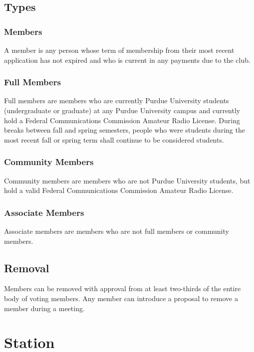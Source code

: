 \documentclass{article}
\begin{document}
\subsection{Types}

\subsubsection{Members}

A member is any person whose term of membership from their most recent
application has not expired and who is current in any payments due to the club.

\subsubsection{Full Members}

Full members are members who are currently Purdue University students
(undergraduate or graduate) at any Purdue University campus and currently hold a
Federal Communications Commission Amateur Radio License. During breaks between
fall and spring semesters, people who were students during the most recent fall
or spring term shall continue to be considered students.

\subsubsection{Community Members}

Community members are members who are not Purdue University students, but hold a
valid Federal Communications Commission Amateur Radio License.

\subsubsection{Associate Members}

Associate members are members who are not full members or community members.

\subsection{Removal}

Members can be removed with approval from at least two-thirds of the entire body
of voting members. Any member can introduce a proposal to remove a member during
a meeting.

\section{Station}
\end{document}
